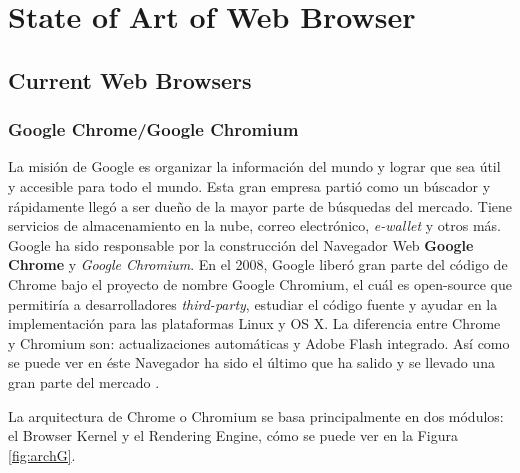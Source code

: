 \chapter{State of Art of Web Browser} %
\label{chap3:EA}
\section{Current Web Browsers}
\label{chap3:BrowExis}

    \subsection{Google Chrome/Google Chromium}
    \label{chap3:GC}
    La misión de Google es organizar la información del mundo y lograr que sea útil y accesible para todo el mundo. Esta gran empresa partió como un búscador y rápidamente llegó a ser dueño de la mayor parte de búsquedas del mercado. Tiene servicios de almacenamiento en la nube, correo electrónico, \textit{e-wallet} y otros más. Google ha sido responsable por la construcción del Navegador Web \textbf{Google Chrome} y \textit{Google Chromium}. En el 2008, Google liberó gran parte del código de Chrome bajo el proyecto de nombre Google Chromium, el cuál es open-source que permitiría a desarrolladores \textit{third-party}, estudiar el código fuente y ayudar en la implementación para las plataformas Linux y OS X. La diferencia entre Chrome y Chromium son: actualizaciones automáticas y Adobe Flash integrado. Así como se puede ver en \cite{EvolutionofWeb} éste Navegador ha sido el último que ha salido y se llevado una gran parte del mercado \cite{statBrow}.

    La arquitectura de Chrome o Chromium se basa principalmente en dos módulos: el Browser Kernel y el Rendering Engine, cómo se puede ver en la Figura \ref{fig:archG}.

